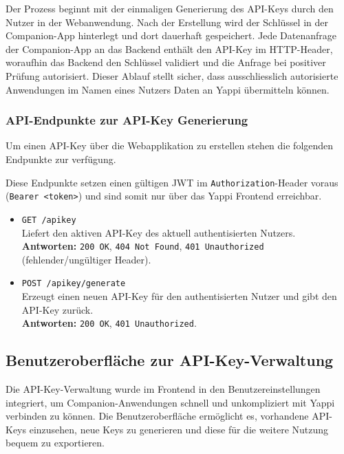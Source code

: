 \documentclass[12pt,a4paper]{report}
\begin{document}
Der Prozess beginnt mit der einmaligen Generierung des API-Keys durch den Nutzer in der Webanwendung. Nach der Erstellung wird der
Schlüssel in der Companion-App hinterlegt und dort dauerhaft gespeichert. Jede Datenanfrage der Companion-App an das Backend
enthält den API-Key im HTTP-Header, woraufhin das Backend den Schlüssel validiert und die Anfrage bei positiver Prüfung
autorisiert. Dieser Ablauf stellt sicher, dass ausschliesslich autorisierte Anwendungen im Namen eines Nutzers Daten an Yappi
übermitteln können.

\subsubsection{API-Endpunkte zur API-Key Generierung}

Um einen API-Key über die Webapplikation zu erstellen stehen die folgenden Endpunkte zur verfügung.

Diese Endpunkte setzen einen gültigen JWT im \texttt{Authorization}-Header voraus (\texttt{Bearer <token>}) und sind somit nur 
über das Yappi Frontend erreichbar.

\begin{itemize}
  \item \texttt{GET /apikey} \\
        Liefert den aktiven API-Key des aktuell authentisierten Nutzers. \\
        \textbf{Antworten:} \texttt{200 OK}, \texttt{404 Not Found}, \texttt{401 Unauthorized} (fehlender/ungültiger Header).
  \item \texttt{POST /apikey/generate} \\
        Erzeugt einen neuen API-Key für den authentisierten Nutzer und gibt den API-Key zurück. \\
        \textbf{Antworten:} \texttt{200 OK}, \texttt{401 Unauthorized}.
\end{itemize}

\subsection{Benutzeroberfläche zur API-Key-Verwaltung}

Die API-Key-Verwaltung wurde im Frontend in den Benutzereinstellungen integriert, um Companion-Anwendungen schnell und
unkompliziert mit Yappi verbinden zu können. Die Benutzeroberfläche ermöglicht es, vorhandene API-Keys einzusehen, neue Keys zu
generieren und diese für die weitere Nutzung bequem zu exportieren.  
\end{document}
